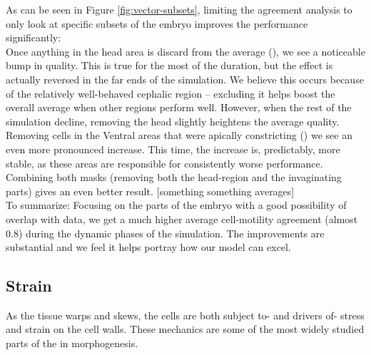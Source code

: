As can be seen in Figure \ref{fig:vector-subsets}, limiting the agreement analysis to only look at specific subsets of the embryo improves the performance significantly:\\

Once anything in the head area is discard from the average (), we see a noticeable bump in quality. This is true for the most of the duration, but the effect is actually reversed in the far ends of the simulation. We believe this occurs because of the relatively well-behaved cephalic region --  excluding it helps boost the overall average when other regions perform well. However, when the rest of the simulation decline, removing the head slightly heightens the average quality. \\

Removing cells in the Ventral areas that were apically constricting () we see an even more pronounced increase. This time, the increase is, predictably, more stable, as these areas are responsible for consistently worse performance. \\

Combining both masks (removing both the head-region and the  invaginating parts) gives an even better result. [something something averages] \\


To summarize: Focusing on the parts of the embryo with a good possibility of overlap with data, we get a much higher average cell-motility agreement (almost 0.8) during the dynamic phases of the simulation. The improvements are substantial and we feel it helps portray how our model can excel.

\subsection{Strain}
As the tissue warps and skews, the cells are both subject to- and drivers of- stress and strain on the cell walls. These mechanics are some of the most widely studied parts of the in morphogenesis.\\

